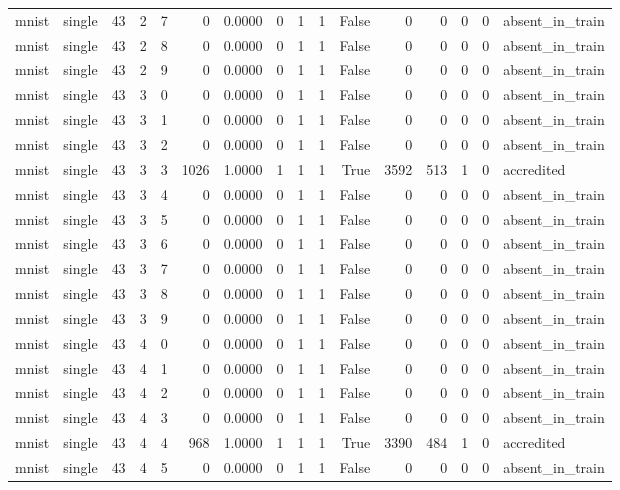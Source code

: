 \begin{tabular}{llrrrrrrrrrrrrrl}
mnist & single & 43 & 2 & 7 & 0 & 0.0000 & 0 & 1 & 1 & False & 0 & 0 & 0 & 0 & absent\_in\_train \\
mnist & single & 43 & 2 & 8 & 0 & 0.0000 & 0 & 1 & 1 & False & 0 & 0 & 0 & 0 & absent\_in\_train \\
mnist & single & 43 & 2 & 9 & 0 & 0.0000 & 0 & 1 & 1 & False & 0 & 0 & 0 & 0 & absent\_in\_train \\
mnist & single & 43 & 3 & 0 & 0 & 0.0000 & 0 & 1 & 1 & False & 0 & 0 & 0 & 0 & absent\_in\_train \\
mnist & single & 43 & 3 & 1 & 0 & 0.0000 & 0 & 1 & 1 & False & 0 & 0 & 0 & 0 & absent\_in\_train \\
mnist & single & 43 & 3 & 2 & 0 & 0.0000 & 0 & 1 & 1 & False & 0 & 0 & 0 & 0 & absent\_in\_train \\
mnist & single & 43 & 3 & 3 & 1026 & 1.0000 & 1 & 1 & 1 & True & 3592 & 513 & 1 & 0 & accredited \\
mnist & single & 43 & 3 & 4 & 0 & 0.0000 & 0 & 1 & 1 & False & 0 & 0 & 0 & 0 & absent\_in\_train \\
mnist & single & 43 & 3 & 5 & 0 & 0.0000 & 0 & 1 & 1 & False & 0 & 0 & 0 & 0 & absent\_in\_train \\
mnist & single & 43 & 3 & 6 & 0 & 0.0000 & 0 & 1 & 1 & False & 0 & 0 & 0 & 0 & absent\_in\_train \\
mnist & single & 43 & 3 & 7 & 0 & 0.0000 & 0 & 1 & 1 & False & 0 & 0 & 0 & 0 & absent\_in\_train \\
mnist & single & 43 & 3 & 8 & 0 & 0.0000 & 0 & 1 & 1 & False & 0 & 0 & 0 & 0 & absent\_in\_train \\
mnist & single & 43 & 3 & 9 & 0 & 0.0000 & 0 & 1 & 1 & False & 0 & 0 & 0 & 0 & absent\_in\_train \\
mnist & single & 43 & 4 & 0 & 0 & 0.0000 & 0 & 1 & 1 & False & 0 & 0 & 0 & 0 & absent\_in\_train \\
mnist & single & 43 & 4 & 1 & 0 & 0.0000 & 0 & 1 & 1 & False & 0 & 0 & 0 & 0 & absent\_in\_train \\
mnist & single & 43 & 4 & 2 & 0 & 0.0000 & 0 & 1 & 1 & False & 0 & 0 & 0 & 0 & absent\_in\_train \\
mnist & single & 43 & 4 & 3 & 0 & 0.0000 & 0 & 1 & 1 & False & 0 & 0 & 0 & 0 & absent\_in\_train \\
mnist & single & 43 & 4 & 4 & 968 & 1.0000 & 1 & 1 & 1 & True & 3390 & 484 & 1 & 0 & accredited \\
mnist & single & 43 & 4 & 5 & 0 & 0.0000 & 0 & 1 & 1 & False & 0 & 0 & 0 & 0 & absent\_in\_train \\

\end{tabular}
